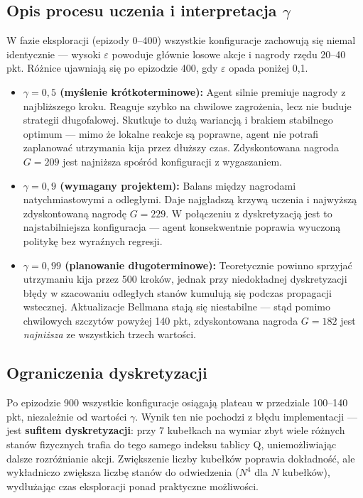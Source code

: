 \documentclass[12pt,a4paper]{article}
\begin{document}
\subsection{Opis procesu uczenia i interpretacja $\gamma$}

W fazie eksploracji (epizody 0–400) wszystkie konfiguracje zachowują się
niemal identycznie — wysoki $\varepsilon$ powoduje głównie losowe akcje
i nagrody rzędu 20–40 pkt. Różnice ujawniają się po epizodzie 400,
gdy $\varepsilon$ opada poniżej 0{,}1.

\begin{itemize}
    \item \textbf{$\gamma = 0{,}5$ (myślenie krótkoterminowe):}
    Agent silnie premiuje nagrody z najbliższego kroku.
    Reaguje szybko na chwilowe zagrożenia, lecz nie buduje strategii
    długofalowej. Skutkuje to dużą wariancją i brakiem stabilnego
    optimum — mimo że lokalne reakcje są poprawne, agent nie potrafi
    zaplanować utrzymania kija przez dłuższy czas.
    Zdyskontowana nagroda $G = 209$ jest najniższa spośród
    konfiguracji z wygaszaniem.

    \item \textbf{$\gamma = 0{,}9$ (wymagany projektem):}
    Balans między nagrodami natychmiastowymi a odległymi.
    Daje najgładszą krzywą uczenia i najwyższą zdyskontowaną nagrodę
    $G = 229$. W połączeniu z dyskretyzacją jest to najstabilniejsza
    konfiguracja — agent konsekwentnie poprawia wyuczoną politykę
    bez wyraźnych regresji.

    \item \textbf{$\gamma = 0{,}99$ (planowanie długoterminowe):}
    Teoretycznie powinno sprzyjać utrzymaniu kija przez 500 kroków,
    jednak przy niedokładnej dyskretyzacji błędy w szacowaniu
    odległych stanów kumulują się podczas propagacji wstecznej.
    Aktualizacje Bellmana stają się niestabilne — stąd pomimo
    chwilowych szczytów powyżej 140 pkt, zdyskontowana nagroda
    $G = 182$ jest \emph{najniższa} ze wszystkich trzech wartości.
\end{itemize}

\subsection{Ograniczenia dyskretyzacji}

Po epizodzie 900 wszystkie konfiguracje osiągają plateau w przedziale
100–140 pkt, niezależnie od wartości $\gamma$. Wynik ten nie pochodzi
z błędu implementacji — jest \textbf{sufitem dyskretyzacji}:
przy 7 kubełkach na wymiar zbyt wiele różnych stanów fizycznych trafia
do tego samego indeksu tablicy Q, uniemożliwiając dalsze rozróżnianie
akcji. Zwiększenie liczby kubełków poprawia dokładność, ale
wykładniczo zwiększa liczbę stanów do odwiedzenia ($N^4$ dla $N$ kubełków),
wydłużając czas eksploracji ponad praktyczne możliwości.
\end{document}

